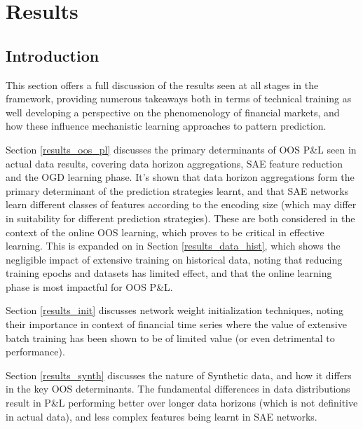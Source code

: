\documentclass[a4paper,11pt,oneside]{article}
\theoremstyle{plain}
\theoremstyle{definition}
\begin{document}
	
	
	
	
	
	
	
	
	
	\newpage
	\section{Results}\label{Results}
	\subsection{Introduction}\label{results_into}
	
	This section offers a full discussion of the results seen at all stages in the framework, providing numerous takeaways both in terms of technical training as well developing a perspective on the phenomenology of financial markets, and how these influence mechanistic learning approaches to pattern prediction. \newline
	
	Section \ref{results_oos_pl} discusses the primary determinants of OOS P\&L seen in actual data results, covering data horizon aggregations, SAE feature reduction and the OGD learning phase. It's shown that data horizon aggregations form the primary determinant of the prediction strategies learnt, and that SAE networks learn different classes of features according to the encoding size (which may differ in suitability for different prediction strategies). These are both considered in the context of the online OOS learning, which proves to be critical in effective learning. This is expanded on in Section \ref{results_data_hist}, which shows the negligible impact of extensive training on historical data, noting that reducing training epochs and datasets has limited effect, and that the online learning phase is most impactful for OOS P\&L. \newline
	
	Section \ref{results_init} discusses network weight initialization techniques, noting their importance in context of financial time series where the value of extensive batch training has been shown to be of limited value (or even detrimental to performance).\newline
	
	Section \ref{results_synth} discusses the nature of Synthetic data, and how it differs in the key OOS determinants. The fundamental differences in data distributions result in P\&L performing better over longer data horizons (which is not definitive in actual data), and less complex features being learnt in SAE networks.\newline
	
\end{document}
